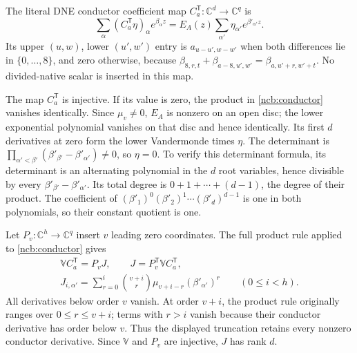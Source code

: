 The literal DNE conductor coefficient map
$C_a^{\mathsf T}:\mathbb C^d\to\mathbb C^q$ is
\begin{equation}\tag{NCB3}\label{ncb:conductor}
\sum_\alpha(C_a^{\mathsf T}\eta)_\alpha e^{\beta_\alpha z}
=E_A(z)\sum_{\alpha'}\eta_{\alpha'}e^{\beta'_{\alpha'}z}.
\end{equation}
Its upper $(u,w)$, lower $(u',w')$ entry is
$a_{u-u',w-w'}$ when both differences lie in $\{0,\ldots,8\}$, and
zero otherwise, because
$\beta_{8,r,t}+\beta_{a-8,u',w'}=\beta_{a,u'+r,w'+t}$.
No divided-native scalar is inserted in this map.

The map $C_a^{\mathsf T}$ is injective. If its value is zero, the
product in \eqref{ncb:conductor} vanishes identically. Since
$\mu_v\ne0$, $E_A$ is nonzero on an open disc; the lower exponential
polynomial vanishes on that disc and hence identically. Its first $d$
derivatives at zero form the lower Vandermonde times $\eta$. The
determinant is
$\prod_{\alpha'<\beta'}(\beta'_{\beta'}-\beta'_{\alpha'})\ne0$,
so $\eta=0$.
To verify this determinant formula, its determinant is an alternating
polynomial in the $d$ root variables, hence divisible by every
$\beta'_{\beta'}-\beta'_{\alpha'}$. Its total degree is
$0+1+\cdots+(d-1)$, the degree of their product. The coefficient of
$(\beta'_1)^0(\beta'_2)^1\cdots(\beta'_d)^{d-1}$ is one in both
polynomials, so their constant quotient is one.

Let $P_v:\mathbb C^h\to\mathbb C^q$ insert $v$ leading zero
coordinates. The full product rule applied to \eqref{ncb:conductor}
gives
\begin{equation}\tag{NCB4}\label{ncb:moment-conductor}
\begin{gathered}
\mathbb VC_a^{\mathsf T}=P_vJ,\qquad
J=P_v^{\mathsf T}\mathbb VC_a^{\mathsf T},\\
J_{i,\alpha'}=\sum_{r=0}^{i}
\binom{v+i}{r}\mu_{v+i-r}(\beta'_{\alpha'})^r
\qquad(0\leq i<h).
\end{gathered}
\end{equation}
All derivatives below order $v$ vanish. At order $v+i$, the product
rule originally ranges over $0\leq r\leq v+i$; terms with $r>i$
vanish because their conductor derivative has order below $v$.
Thus the displayed truncation retains every nonzero conductor
derivative. Since $\mathbb V$ and $P_v$ are injective, $J$ has rank $d$.

